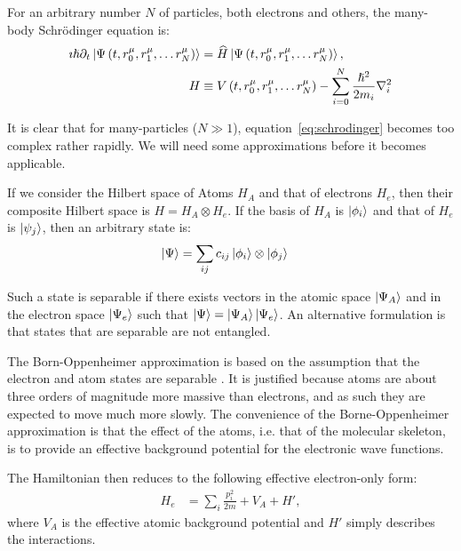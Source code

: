For an arbitrary number $N$ of particles, both electrons and others, the many-body Schr\"odinger equation is:
\begin{align}
 \imath \hslash \partial_t\ket{\Psi\left(t, r_0^\mu, r_1^\mu, \ldots r_N^\mu\right)} &= \widehat{H} \ket{\Psi\left(t, r_0^\mu, r_1^\mu, \ldots r_N^\mu\right)} \label{eq:schrodinger}, \\
 H &\equiv V\left(t, r_0^\mu, r_1^\mu, \ldots r_N^\mu\right) - \sum_{i=0}^N \frac{\hslash^2}{2m_i} \nabla_i^2
\end{align}

It is clear that for many-particles ($N\gg 1$), equation~\ref{eq:schrodinger} becomes too complex rather rapidly. We will need some approximations before it becomes applicable.

If we consider the Hilbert space of Atoms $H_A$ and that of electrons $H_e$, then their composite Hilbert space is $H = H_A \otimes H_e$. If the basis of $H_A$ is $\ket{\phi_i}$ and that of $H_e$ is $\ket{\psi_j}$, then an arbitrary state is:
\begin{align}
\ket{\Psi} &= \sum_{ij} c_{ij} \ket{\phi_i} \otimes \ket{\phi_j}
\end{align}

Such a state is separable if there exists vectors in the atomic space $\ket{\Psi_A}$ and in the electron space $\ket{\Psi_e}$ such that $\ket{\Psi} = \ket{\Psi_A} \ket{\Psi_e}$. An alternative formulation is that states that are separable are not entangled.

The Born-Oppenheimer approximation is based on the assumption that the electron and atom  states are separable \cite{mattuck}. It is justified because atoms are about three orders of magnitude more massive than electrons, and as such they are expected to move much more slowly. The convenience of the Borne-Oppenheimer approximation is that the effect of the atoms, i.e. that of the molecular skeleton, is to provide an effective background potential for the electronic wave functions.

The Hamiltonian then reduces to the following effective electron-only form:
\begin{align}
H_e &= \sum_i \frac{p_i^2}{2m} + V_A + H',
\end{align}
where $V_A$ is the effective atomic background potential and $H'$ simply describes the interactions.


